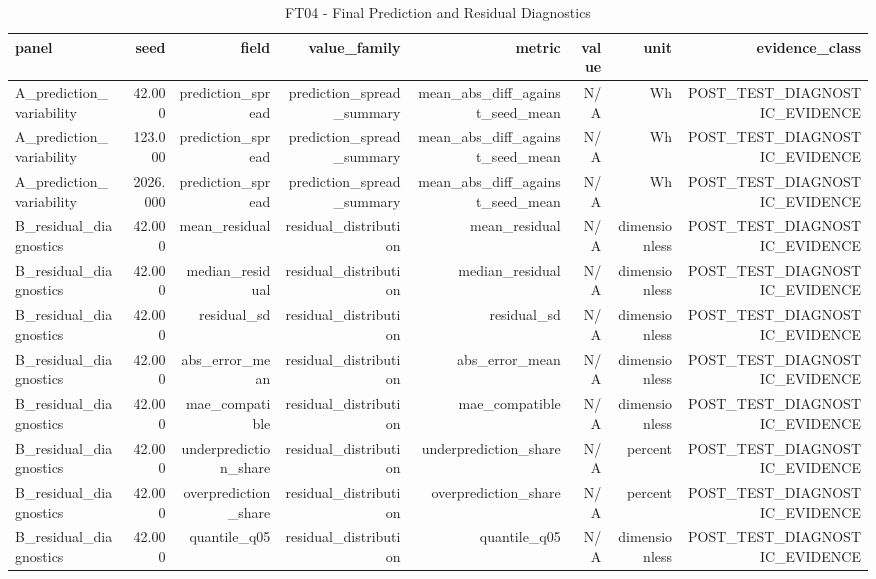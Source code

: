 \begin{table}[h!]
\centering
\caption{FT04 - Final Prediction and Residual Diagnostics}
\label{tab:ft04\_-\_final\_prediction\_and\_residual\_diagnostics}
\begin{tabular}{lrrrrrrr}
\toprule
panel & seed & field & value\_family & metric & value & unit & evidence\_class \\
\midrule
A\_prediction\_variability & 42.000 & prediction\_spread & prediction\_spread\_summary & mean\_abs\_diff\_against\_seed\_mean & N/A & Wh & POST\_TEST\_DIAGNOSTIC\_EVIDENCE \\
A\_prediction\_variability & 123.000 & prediction\_spread & prediction\_spread\_summary & mean\_abs\_diff\_against\_seed\_mean & N/A & Wh & POST\_TEST\_DIAGNOSTIC\_EVIDENCE \\
A\_prediction\_variability & 2026.000 & prediction\_spread & prediction\_spread\_summary & mean\_abs\_diff\_against\_seed\_mean & N/A & Wh & POST\_TEST\_DIAGNOSTIC\_EVIDENCE \\
B\_residual\_diagnostics & 42.000 & mean\_residual & residual\_distribution & mean\_residual & N/A & dimensionless & POST\_TEST\_DIAGNOSTIC\_EVIDENCE \\
B\_residual\_diagnostics & 42.000 & median\_residual & residual\_distribution & median\_residual & N/A & dimensionless & POST\_TEST\_DIAGNOSTIC\_EVIDENCE \\
B\_residual\_diagnostics & 42.000 & residual\_sd & residual\_distribution & residual\_sd & N/A & dimensionless & POST\_TEST\_DIAGNOSTIC\_EVIDENCE \\
B\_residual\_diagnostics & 42.000 & abs\_error\_mean & residual\_distribution & abs\_error\_mean & N/A & dimensionless & POST\_TEST\_DIAGNOSTIC\_EVIDENCE \\
B\_residual\_diagnostics & 42.000 & mae\_compatible & residual\_distribution & mae\_compatible & N/A & dimensionless & POST\_TEST\_DIAGNOSTIC\_EVIDENCE \\
B\_residual\_diagnostics & 42.000 & underprediction\_share & residual\_distribution & underprediction\_share & N/A & percent & POST\_TEST\_DIAGNOSTIC\_EVIDENCE \\
B\_residual\_diagnostics & 42.000 & overprediction\_share & residual\_distribution & overprediction\_share & N/A & percent & POST\_TEST\_DIAGNOSTIC\_EVIDENCE \\
B\_residual\_diagnostics & 42.000 & quantile\_q05 & residual\_distribution & quantile\_q05 & N/A & dimensionless & POST\_TEST\_DIAGNOSTIC\_EVIDENCE \\

\end{tabular}
\end{table}
